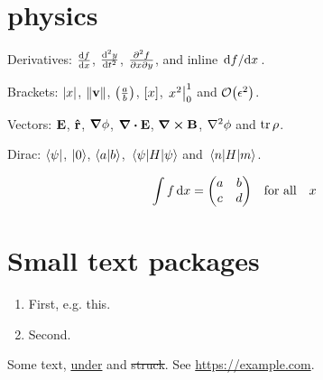 \documentclass{article}
\begin{document}
\section{physics}
Derivatives: $\dv{f}{x}$, $\dv[2]{y}{t}$, $\pdv{f}{x}{y}$, and inline $\dv*{f}{x}$.

Brackets: $\abs{x}$, $\norm{\vb{v}}$, $\qty(\frac{a}{b})$, $\qty[x]$, $\eval{x^2}_0^1$ and $\order{\epsilon^2}$.

Vectors: $\vb{E}$, $\vu{r}$, $\grad\phi$, $\div\vb{E}$, $\curl\vb{B}$, $\laplacian\phi$ and $\tr\rho$.

Dirac: $\bra{\psi}$, $\ket{0}$, $\braket{a}{b}$, $\expval{H}{\psi}$ and $\mel{n}{H}{m}$.

\[ \int f \dd{x} = \mqty(a & b \\ c & d) \qq{for all} x \]

\section{Small text packages}
\begin{enumerate}[label=(\alph*)]
  \item First, e.g.\xspace this.
  \item Second.
\end{enumerate}
\lipsum[1-2]
Some text, \uline{under} and \sout{struck}. See \url{https://example.com}.
\end{document}
